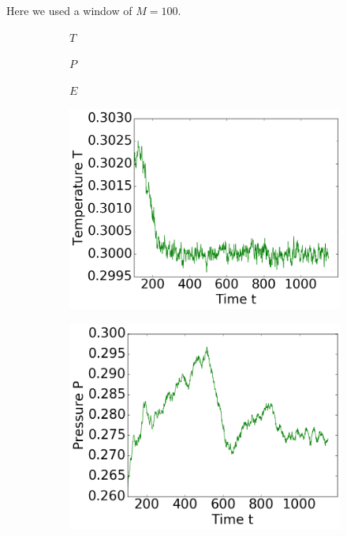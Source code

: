 Here we used a window of $M = 100$.
\begin{figure}[ht]
\hfill
\begin{subfigure}{0.3\textwidth}
\centering
$T$
\end{subfigure}
\hfill
\begin{subfigure}{0.3\textwidth}
\centering
$P$
\end{subfigure}
\hfill
\begin{subfigure}{0.3\textwidth}
\centering
$E$
\end{subfigure}

\begin{subfigure}{0.3\textwidth}
\includegraphics[width=\textwidth]{../dat/avTemperature_T0d3_F20d0_M100.png}
\end{subfigure}
\hfill
\begin{subfigure}{0.3\textwidth}
\includegraphics[width=\textwidth]{../dat/avPressure_T0d3_F20d0_M100.png}

\end{subfigure}
\end{figure}
